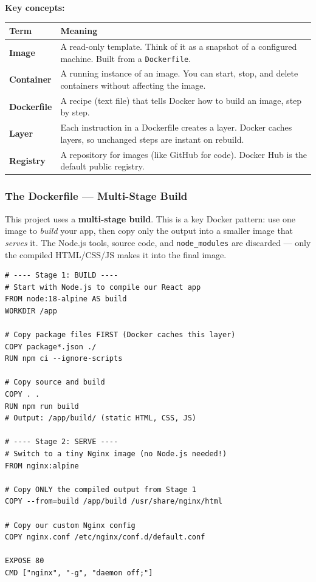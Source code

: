\documentclass[11pt, letterpaper]{article}
\begin{document}
\textbf{Key concepts:}

\begin{center}
\begin{tabularx}{0.9\textwidth}{lX}
\toprule
\textbf{Term} & \textbf{Meaning} \\
\midrule
\textbf{Image} & A read-only template. Think of it as a snapshot of a
                  configured machine. Built from a \texttt{Dockerfile}. \\
\textbf{Container} & A running instance of an image. You can start, stop,
                      and delete containers without affecting the image. \\
\textbf{Dockerfile} & A recipe (text file) that tells Docker how to build
                       an image, step by step. \\
\textbf{Layer} & Each instruction in a Dockerfile creates a layer. Docker
                 caches layers, so unchanged steps are instant on rebuild. \\
\textbf{Registry} & A repository for images (like GitHub for code).
                     Docker Hub is the default public registry. \\
\bottomrule
\end{tabularx}
\end{center}

\subsubsection{The Dockerfile --- Multi-Stage Build}

This project uses a \textbf{multi-stage build}. This is a key Docker pattern:
use one image to \textit{build} your app, then copy only the output into a
smaller image that \textit{serves} it. The Node.js tools, source code, and
\texttt{node\_modules} are discarded --- only the compiled HTML/CSS/JS makes
it into the final image.

\begin{lstlisting}[style=code, caption={Dockerfile --- annotated}]
# ---- Stage 1: BUILD ----
# Start with Node.js to compile our React app
FROM node:18-alpine AS build
WORKDIR /app

# Copy package files FIRST (Docker caches this layer)
COPY package*.json ./
RUN npm ci --ignore-scripts

# Copy source and build
COPY . .
RUN npm run build
# Output: /app/build/ (static HTML, CSS, JS)

# ---- Stage 2: SERVE ----
# Switch to a tiny Nginx image (no Node.js needed!)
FROM nginx:alpine

# Copy ONLY the compiled output from Stage 1
COPY --from=build /app/build /usr/share/nginx/html

# Copy our custom Nginx config
COPY nginx.conf /etc/nginx/conf.d/default.conf

EXPOSE 80
CMD ["nginx", "-g", "daemon off;"]
\end{lstlisting}
\end{document}

